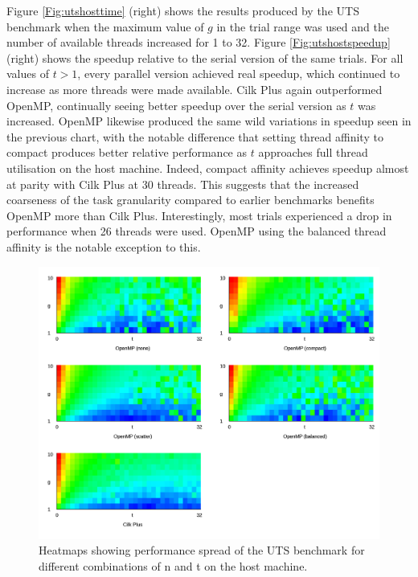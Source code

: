 \documentclass{report}
\begin{document}
Figure \ref{Fig:utshosttime} (right) shows the results produced by the UTS benchmark when the maximum value of \(g\) in the trial range was used and the number of available threads increased for 1 to 32. Figure \ref{Fig:utshostspeedup} (right) shows the speedup relative to the serial version of the same trials. For all values of \(t>1\), every parallel version achieved real speedup, which continued to increase as more threads were made available. Cilk Plus again outperformed OpenMP, continually seeing better speedup over the serial version as \(t\) was increased. OpenMP likewise produced the same wild variations in speedup seen in the previous chart, with the notable difference that setting thread affinity to compact produces better relative performance as \(t\) approaches full thread utilisation on the host machine. Indeed, compact affinity achieves speedup almost at parity with Cilk Plus at 30 threads. This suggests that the increased coarseness of the task granularity compared to earlier benchmarks benefits OpenMP more than Cilk Plus. Interestingly, most trials experienced a drop in performance when 26 threads were used. OpenMP using the balanced thread affinity is the notable exception to this.
\noindent
\begin{figure}[t!]
	\includegraphics[width=\linewidth]{../../heatmaps/intel64/uts}
	\caption{Heatmaps showing performance spread of the UTS benchmark for different combinations of n and t on the host machine.}
	\label{Fig:utshostheatmap}
\end{figure}
\end{document}

